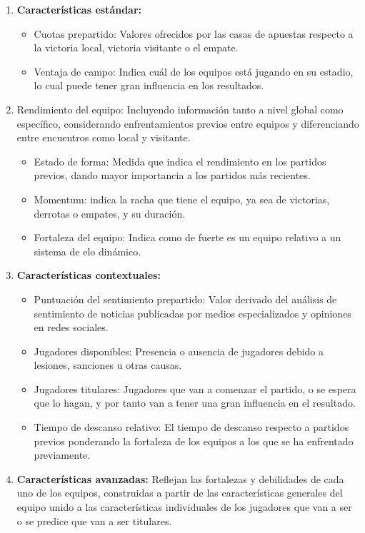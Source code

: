 \begin{enumerate}
    \item \textbf{Características estándar:}
        \begin{itemize}
            \item Cuotas prepartido: Valores ofrecidos por las casas de apuestas respecto a la victoria local, victoria visitante o el empate.
            \item Ventaja de campo: Indica cuál de los equipos está jugando en su estadio, lo cual puede tener gran influencia en los resultados.
        \end{itemize}
    \item Rendimiento del equipo: Incluyendo información tanto a nivel global como específico, considerando enfrentamientos previos entre equipos y diferenciando entre encuentros como local y visitante.
    \begin{itemize}
        \item Estado de forma: Medida que indica el rendimiento en los partidos previos, dando mayor importancia a los partidos más recientes.
        \item Momentum: indica la racha que tiene el equipo, ya sea de victorias, derrotas o empates, y su duración.
        \item Fortaleza del equipo: Indica como de fuerte es un equipo relativo a un sistema de elo dinámico.
    \end{itemize}
    \item \textbf{Características contextuales:}
    \begin{itemize}
        \item Puntuación del sentimiento prepartido: Valor derivado del análisis de sentimiento de noticias publicadas por medios especializados y opiniones en redes sociales.
        \item Jugadores disponibles: Presencia o ausencia de jugadores debido a lesiones, sanciones u otras causas.
        \item Jugadores titulares: Jugadores que van a comenzar el partido, o se espera que lo hagan, y por tanto van a tener una gran influencia en el resultado.
        \item Tiempo de descanso relativo: El tiempo de descanso respecto a partidos previos ponderando la fortaleza de los equipos a los que se ha enfrentado previamente.
    \end{itemize}
    \item \textbf{Características avanzadas:} Reflejan las fortalezas y debilidades de cada uno de los equipos, construidas a partir de las características generales del equipo unido a las características individuales de los jugadores que van a ser o se predice que van a ser titulares.

\end{enumerate}
